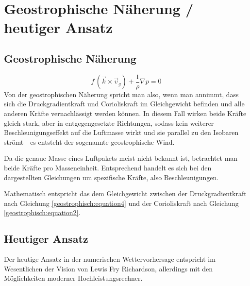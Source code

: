 %
%
%
%
\section{Geostrophische Näherung / heutiger Ansatz
\label{geostrophisch:section:geoNäherung}}
\subsection{Geostrophische Näherung}
\begin{equation}
f\, (\vec{k} \times \vec{v}_g) 
+
\frac{1}{\rho} \nabla p
=
0
\label{geostrophisch:equation5}
\end{equation}
Von der geostrophischen Näherung spricht man also, wenn man annimmt, dass sich die Druckgradientkraft und Corioliskraft im Gleichgewicht befinden und alle anderen Kräfte vernachlässigt werden können. In diesem Fall wirken beide Kräfte gleich stark, aber in entgegengesetzte Richtungen, sodass kein weiterer Beschleunigungseffekt auf die Luftmasse wirkt und sie parallel zu den Isobaren strömt - es entsteht der sogenannte geostrophische Wind.

\vspace{1em}

Da die genaue Masse eines Luftpakets meist nicht bekannt ist, betrachtet man beide Kräfte pro Masseneinheit. Entsprechend handelt es sich bei den dargestellten Gleichungen um spezifische Kräfte, also Beschleunigungen.

\vspace{1em}

Mathematisch entspricht das dem Gleichgewicht zwischen der Druckgradientkraft nach Gleichung \eqref{geostrophisch:equation4} und der Corioliskraft nach Gleichung \eqref{geostrophisch:equation2}.

\subsection{Heutiger Ansatz}

Der heutige Ansatz in der numerischen Wettervorhersage entspricht im Wesentlichen der Vision von Lewis Fry Richardson, allerdings mit den Möglichkeiten moderner Hochleistungsrechner.

